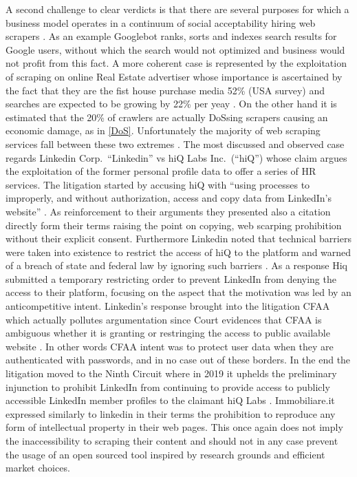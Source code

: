 \documentclass[
  12pt,
  a4paper,
  oneside]{book}
\theoremstyle{definition}
\theoremstyle{definition}
\theoremstyle{definition}
\theoremstyle{remark}
\begin{document}
A second challenge to clear verdicts is that there are several purposes for which a business model operates in a continuum of social acceptability hiring web scrapers \citep{ADetaile90}. As an example Googlebot ranks, sorts and indexes search results for Google users, without which the search would not optimized and business would not profit from this fact. A more coherent case is represented by the exploitation of scraping on online Real Estate advertiser whose importance is ascertained by the fact that they are the fist house purchase media 52\% (USA survey) and searches are expected to be growing by 22\% per yeay \citep{peterson2003consumer}. On the other hand it is estimated that the 20\% of crawlers are actually DoSsing scrapers \citep{TheInter5} causing an economic damage, as in \ref{DoS}. Unfortunately the majority of web scraping services fall between these two extremes \citeyearpar{WhatCour57}.
The most discussed and observed case regards Linkedin Corp.~``Linkedin'' vs hiQ Labs Inc.~(``hiQ'') whose claim argues the exploitation of the former personal profile data to offer a series of HR services. The litigation started by accusing hiQ with ``using processes to improperly, and without authorization, access and copy data from LinkedIn's website'' \citep{Letterfr71}. As reinforcement to their arguments they presented also a citation directly form their terms raising the point on copying, web scarping prohibition without their explicit consent. Furthermore Linkedin noted that technical barriers were taken into existence to restrict the access of hiQ to the platform and warned of a breach of state and federal law by ignoring such barriers \citeyearpar{WhatCour57}. As a response Hiq submitted a temporary restricting order to prevent LinkedIn from denying the access to their platform, focusing on the aspect that the motivation was led by an anticompetitive intent. Linkedin's response brought into the litigation CFAA which actually pollutes argumentation since Court evidences that CFAA is ambiguous whether it is granting or restringing the access to public available website \citep{hiQLabsI66}. In other words CFAA intent was to protect user data when they are authenticated with passwords, and in no case out of these borders. In the end the litigation moved to the Ninth Circuit where in 2019 it uphelds the preliminary injunction to prohibit LinkedIn from continuing to provide access to publicly accessible LinkedIn member profiles to the claimant hiQ Labs \citep{wiki:HiQvsLinkedIn}.
Immobiliare.it expressed similarly to linkedin in their terms \citep{immobiliareterms} the prohibition to reproduce any form of intellectual property in their web pages. This once again does not imply the inaccessibility to scraping their content and should not in any case prevent the usage of an open sourced tool inspired by research grounds and efficient market choices.
\end{document}
